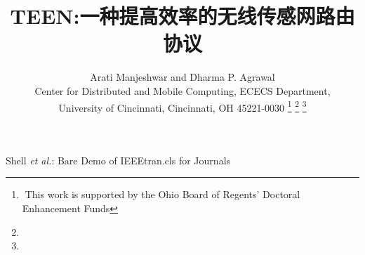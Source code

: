 \documentclass[journal]{IEEEtran}
\renewcommand\thesection{\arabic{section}}
\renewcommand\thesubsection{\thesection.\arabic{subsection}}
\begin{document}
\renewcommand\thesection{\arabic{section}}

\renewcommand\thesubsection{\thesection.\arabic{subsection}}
%
\begin{CJK}{UTF8}{gbsn}

\title{\textbf{TEEN:一种提高效率的无线传感网路由协议}}
%
%
%

\author{Arati Manjeshwar and Dharma P. Agrawal
\\Center for Distributed and Mobile Computing, ECECS Department,
\\University of Cincinnati, Cincinnati, OH 45221-0030
\thanks{This work is supported by the Ohio Board of Regents’ Doctoral Enhancement
Funds}%
\thanks{}%
\thanks{}}

% 
%



%
{Shell \MakeLowercase{\textit{et al.}}: Bare Demo of IEEEtran.cls for Journals}
% 





\end{CJK}
\end{document}
